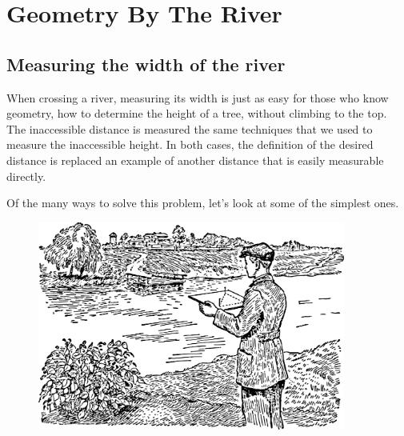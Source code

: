 

\chapter{Geometry By The River}
\label{ch-02}

\section{Measuring the width of the river}
\label{sec-2.1}
When crossing a river, measuring its width is just as easy for those who know geometry, how to determine the height of a tree, without climbing to the top. The inaccessible distance is measured the same techniques that we used to measure the inaccessible height. In both cases, the definition of the desired distance is replaced an example of another distance that is easily measurable directly.

Of the many ways to solve this problem, let's look at some of the simplest ones.

\begin{figure}[h!]
\centering
\includegraphics[width=0.9\textwidth]{figures/ch-02/fig-025.pdf}
\end{figure}

